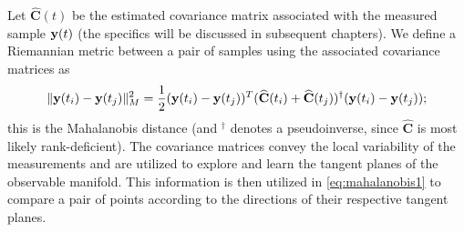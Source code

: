 Let $\widehat{\mathbf{C}}(t)$ be the estimated covariance matrix associated with the measured sample $\mathbf{y}(t)$ (the specifics will be discussed in subsequent chapters).
%
We define a Riemannian metric between a pair of samples using the associated covariance matrices as
\begin{equation}
	\| \mathbf{y}(t_i) - \mathbf{y}(t_j) \|^2_M =  \frac{1}{2} (\mathbf{y}(t_i) - \mathbf{y}(t_j))^T(\widehat{\mathbf{C}}(t_i) + \widehat{\mathbf{C}}(t_j))^{\dagger}(\mathbf{y}(t_i) - \mathbf{y}(t_j));
	\label{eq:mahalanobis1}
\end{equation}
this is the Mahalanobis distance (and $^{\dagger}$ denotes a pseudoinverse, since $\widehat{\mathbf{C}}$ is most likely rank-deficient).
%
The covariance matrices convey the local variability of the measurements and are utilized to explore and learn the tangent planes of the observable manifold.
%
This information is then utilized in \eqref{eq:mahalanobis1} to compare a pair of points according to the directions of their respective tangent planes.
%
